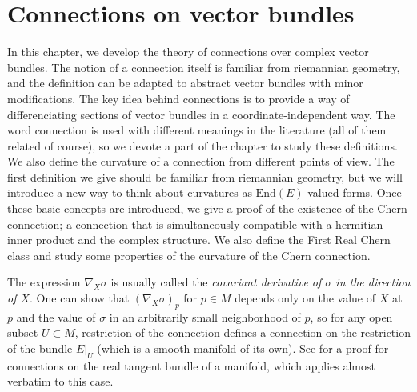 \chapter{Connections on vector bundles} \label{ch_connections}
In this chapter, we develop the theory of connections over complex vector bundles. The notion of a connection itself is familiar from riemannian geometry, and the definition can be adapted to abstract vector bundles with minor modifications. The key idea behind connections is to provide a way of differenciating sections of vector bundles in a coordinate-independent way. The word connection is used with different meanings in the literature (all of them related of course), so we devote a part of the chapter to study these definitions. We also define the curvature of a connection from different points of view. The first definition we give should be familiar from riemannian geometry, but we will introduce a new way to think about curvatures as \(\mathrm{End}(E)\)-valued forms. Once these basic concepts are introduced, we give a proof of the existence of the Chern connection; a connection that is simultaneously compatible with a hermitian inner product and the complex structure. We also define the First Real Chern class and study some properties of the curvature of the Chern connection.

The expression \(\nabla_X \sigma\) is usually called the \textit{covariant derivative of \(\sigma\) in the direction of \(X\)}. One can show that \((\nabla_X \sigma)_p\) for \(p \in M\) depends only on the value of \(X\) at \(p\) and the value of \(\sigma\) in an arbitrarily small neighborhood of \(p\), so for any open subset \(U \subset M\), restriction of the connection defines a connection on the restriction of the bundle \(E|_U\) (which is a smooth manifold of its own). See \parencite[Prop. 4.3]{lee_introRM} for a proof for connections on the real tangent bundle of a manifold, which applies almost verbatim to this case. \\

